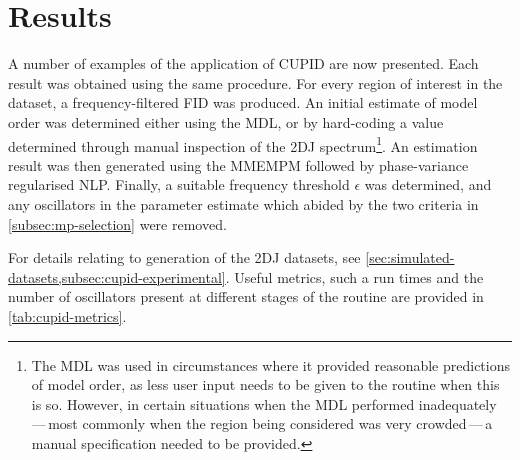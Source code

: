 \section{Results}
\label{subsec:cupid-results}
A number of examples of the application of \ac{CUPID} are now presented.
Each result was obtained using the same procedure. For every region of interest
in the dataset, a frequency-filtered \ac{FID} was produced. An initial estimate
of model order was determined either using the \ac{MDL}, or by hard-coding a
value determined through manual inspection of the \ac{2DJ} spectrum\footnote{
    The \ac{MDL} was used in circumstances where it provided reasonable
    predictions of model order, as less user input needs to be given to the
    routine when this is so. However, in certain situations when the \ac{MDL}
    performed inadequately\,---\,most commonly when the
    region being considered was very crowded\,---\,a manual specification
    needed to be provided.
}.
An estimation result was then generated using the \ac{MMEMPM} followed by
phase-variance regularised \ac{NLP}. Finally, a suitable frequency threshold
$\epsilon$ was determined, and any oscillators in the parameter estimate which
abided by the two criteria in \cref{subsec:mp-selection} were removed.

For details relating to generation of the \ac{2DJ} datasets, see
\cref{sec:simulated-datasets,subsec:cupid-experimental}. Useful
metrics, such a run times and the number of oscillators present at different
stages of the routine are provided in \cref{tab:cupid-metrics}.

